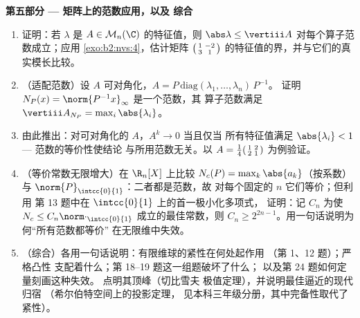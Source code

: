 \begin{problem}
\medskip
\noindent\textbf{第五部分 --- 矩阵上的范数应用，以及
综合}
\begin{enumerate}[resume]
  \item 证明：若 $\lambda$ 是 $A \in
        \mathcal{M}_n(\C)$ 的特征值，则 $\abs\lambda \leq
        \vertiii A$ 对每个算子范数成立；应用
        \cref{exo:b2:nvs:4}，估计矩阵
        $\begin{psmallmatrix}1 & -2\\ 3 & 1\end{psmallmatrix}$
        的特征值的界，并与它们的真实模长比较。
  \item （适配范数）设 $A$ 可对角化，$A =
        P\,\mathrm{diag}(\lambda_1, \dots, \lambda_n)\,P^{-1}$。
        证明 $N_P(x) = \norm{P^{-1}x}_\infty$ 是一个范数，其
        算子范数满足 $\vertiii A_{N_P} =
        \max_i\abs{\lambda_i}$。
  \item 由此推出：对可对角化的 $A$，$A^k \to 0$ 当且仅当
        所有特征值满足 $\abs{\lambda_i} < 1$ ---
        范数的等价性使结论
        与所用范数无关。以 $A =
        \frac14\begin{psmallmatrix}1 & 2\\ 2 &
        1\end{psmallmatrix}$ 为例验证。
  \item （等价常数无限增大）在 $\R_n[X]$ 上比较
        $N_c(P) = \max_k \abs{a_k}$（按系数）与
        $\norm{P}_{\intcc{0}{1}}$：二者都是范数，故
        对每个固定的 $n$ 它们等价；但利用
        第 13 题中在 $\intcc{0}{1}$ 上的首一极小化多项式，
        证明：记 $C_n$ 为使 $N_c \leq
        C_n\norm\cdot_{\intcc{0}{1}}$ 成立的最佳常数，则 $C_n \geq
        2^{2n-1}$。用一句话说明为何“所有范数都等价”
        在无限维中失效。
  \item （综合）各用一句话说明：有限维球的紧性在何处起作用
        （第 1、12 题）；严格凸性
        支配着什么；第 18--19 题这一组题破坏了什么；
        以及第 24 题如何定量刻画这种失效。
        点明其顶峰（切比雪夫
        极值定理），并说明最佳逼近的现代归宿
        （希尔伯特空间上的投影定理，
        见本科三年级分册，其中完备性取代了
        紧性）。
\end{enumerate}
\end{problem}
